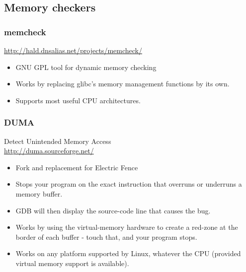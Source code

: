 \subsection{Memory checkers}

\begin{frame}
  \frametitle{memcheck}
  \url{http://hald.dnsalias.net/projects/memcheck/}
  \begin{itemize}
  \item GNU GPL tool for dynamic memory checking
  \item Works by replacing glibc's memory management functions by its own.
  \item Supports most useful CPU architectures.
  \end{itemize}
\end{frame}

\begin{frame}
  \frametitle{DUMA}
  Detect Unintended Memory Access\\
  \url{http://duma.sourceforge.net/}
  \begin{itemize}
  \item Fork and replacement for Electric Fence
  \item Stops your program on the exact instruction that overruns or
    underruns a  memory buffer.
  \item GDB will then display the source-code line that causes the
    bug.
  \item Works by using the virtual-memory hardware to create a
    red-zone at the border of each buffer - touch that, and your
    program stops.
  \item Works on any platform supported by Linux, whatever the CPU
    (provided virtual memory support is available).
  \end{itemize}
\end{frame}

